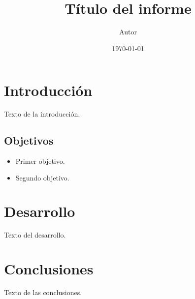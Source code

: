 \documentclass[12pt,a4paper]{report}
\title{Título del informe}
\author{Autor}
\date{\today}
\begin{document}
\maketitle
\tableofcontents

\chapter{Introducción}\label{ch:intro}
Texto de la introducción.

\section{Objetivos}
\begin{itemize}
  \item Primer objetivo.
  \item Segundo objetivo.
\end{itemize}

\chapter{Desarrollo}\label{ch:desarrollo}
Texto del desarrollo.

\chapter{Conclusiones}\label{ch:conclusiones}
Texto de las conclusiones.
\end{document}
